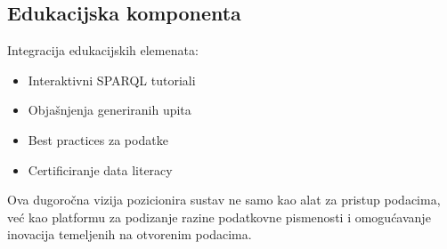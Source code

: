 \subsection{Edukacijska komponenta}

Integracija edukacijskih elemenata:

\begin{itemize}
    \item Interaktivni SPARQL tutoriali
    \item Objašnjenja generiranih upita
    \item Best practices za podatke
    \item Certificiranje data literacy
\end{itemize}

Ova dugoročna vizija pozicionira sustav ne samo kao alat za pristup podacima, već kao platformu za podizanje razine podatkovne pismenosti i omogućavanje inovacija temeljenih na otvorenim podacima. 